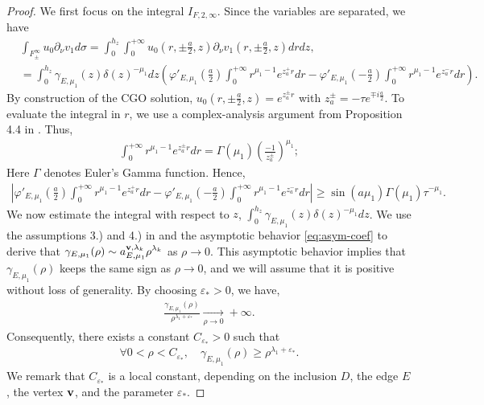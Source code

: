 ﻿\documentclass[11pt,reqno,oneside]{amsart}
\theoremstyle{definition}
\theoremstyle{remark}
\newcommand{\tendvers}[2]{\underset{{#1}\rightarrow {#2}}{\longrightarrow}}
\renewcommand{\d}{\delta}
\newcommand{\e}{\varepsilon}
\newcommand{\g}{\gamma}
\newcommand{\vf}{\varphi}
\newcommand{\lm}{\lambda}
\newcommand{\p}{\partial}
\newcommand{\ds}{\displaystyle}
\begin{document}
\begin{proof}
            We first focus on the integral $I_{F,2,\infty}$. Since the variables are separated, we have
            \begin{align*}
                &\int_{F^\infty_\pm}u_0\p_\nu v_1 d\sigma = \int_0^{h_z} \int_0^{+\infty} u_0(r,\pm \frac{a}{2},z)\p_\nu v_1(r,\pm \frac{a}{2},z) dr dz,\\
                &= \int_0^{h_z} \g_{E,\mu_1}(z) \d(z)^{-\mu_1}dz \left( \vf'_{E,\mu_1}(\frac{a}{2}) \int_0^{+\infty}  r^{\mu_1-1} e^{z^+_a r} dr- \vf'_{E,\mu_1}(-\frac{a}{2}) \int_0^{+\infty}  r^{\mu_1-1} e^{z^-_a r} dr \right).
            \end{align*}
            By construction of the CGO solution, $u_0(r,\pm \frac{a}{2},z) = e^{z^\pm_a r}$ with $z^\pm_a=-\tau e^{\mp i\frac{a}{2}}$. To evaluate the integral in $r$, we use a complex-analysis argument from Proposition 4.4 in \cite{moi5}. Thus,
            \begin{align*}
                \int_0^{+\infty}  r^{\mu_1-1} e^{z^{\pm}_a r} dr =\Gamma(\mu_1)(\frac{-1}{z^\pm_a})^{\mu_1};
            \end{align*}
            Here $\Gamma$ denotes Euler's Gamma function. Hence,
            \begin{align*}
                \left| \vf'_{E,\mu_1}(\frac{a}{2}) \int_0^{+\infty}  r^{\mu_1-1} e^{z^+_a r} dr- \vf'_{E,\mu_1}(-\frac{a}{2}) \int_0^{+\infty}  r^{\mu_1-1} e^{z^-_a r} dr \right| \geq \sin(a\mu_1)\Gamma(\mu_1)\tau^{-\mu_1}.
            \end{align*}
            We now estimate the integral with respect to $z$, $\ds \int_0^{h_z} \g_{E,\mu_1}(z) \d(z)^{-\mu_1}dz$. We use the assumptions 3.) and 4.) in  and the asymptotic behavior \eqref{eq:asym-coef} to derive that $\ds \g_{E,\mu_1}(\rho) \sim a_{E,\mu_1}^{{\bf v},\lm_k} \rho^{\lm_k}$ as $\rho \to 0$. This asymptotic behavior implies that $\g_{E,\mu_1}(\rho)$ keeps the same sign as $\rho \rightarrow 0$, and we will assume that it is positive without loss of generality. By choosing $\e_*>0$, we have,
            \begin{align*}
                \frac{\g_{E,\mu_1}(\rho)}{\rho^{\lm_1+\e_*}} \tendvers{\rho}{0} +\infty.
            \end{align*}
            Consequently, there exists a constant $C_{\e_*}>0$ such that 
            \begin{align*}
                \forall 0<\rho<C_{\e_*},\quad \g_{E,\mu_1}(\rho) \geq  \rho^{\lm_1+\e_*}.
            \end{align*} 
            We remark that $C_{\e_*}$ is a local constant, depending on the inclusion $D$, the edge $E$, the vertex $\bf v$, and the parameter $\e_*$.


\end{proof}
\end{document}
